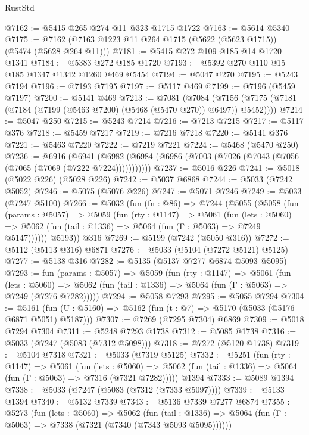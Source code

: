 \begin{lexlean}{RustStd}
\begin{coremodule}
@7162 := @5415 @265 @274 @11 @323 @1715 @1722
@7163 := @5614 @5340
@7175 := @7162 (@7163 @1223 @11 @264 @1715 (@5622 (@5623 @1715)) (@5474 (@5628 @264 @11)))
@7181 := @5415 @272 @109 @185 @14 @1720 @1341
@7184 := @5383 @272 @185 @1720
@7193 := @5392 @270 @110 @15 @185 @1347 @1342 @1260 @469 @5454
@7194 := @5047 @270
@7195 := @5243 @7194
@7196 := @7193 @7195
@7197 := @5117 @469
@7199 := @7196 (@5459 @7197)
@7200 := @5141 @469
@7213 := @7081
    (@7084 (@7156 (@7175 (@7181 (@7184 (@7199 (@5463 @7200) (@5468 (@5470 @270)) @6497)) @5452))))
@7214 := @5047 @250
@7215 := @5243 @7214
@7216 := @7213 @7215
@7217 := @5117 @376
@7218 := @5459 @7217
@7219 := @7216 @7218
@7220 := @5141 @376
@7221 := @5463 @7220
@7222 := @7219 @7221
@7224 := @5468 (@5470 @250)
@7236 := @6916
    (@6941 (@6982 (@6984 (@6986 (@7003 (@7026 (@7043 (@7056 (@7065 (@7069 (@7222 @7224)))))))))))
@7237 := @5016 @226
@7241 := @5018 (@5022 @226) (@5028 @226)
@7242 := @5037 @6868
@7244 := @5033 (@7242 @5052)
@7246 := @5075 (@5076 @226)
@7247 := @5071 @7246
@7249 := @5033 (@7247 @5100)
@7266 := @5032
    (fun (fn : @86) =>
    @7244
      (@5055
        (@5058
          (fun (params : @5057) =>
          @5059
            (fun (rty : @1147) =>
            @5061
              (fun (lets : @5060) =>
              @5062 (fun (tail : @1336) => @5064 (fun (Γ : @5063) => @7249 @5147))))))
        @5193))
    @316
@7269 := @5199 (@7242 (@5050 @316))
@7272 := @5112 (@5113 @316) @6871
@7276 := @5033 (@5104 (@7272 @5121) @5125)
@7277 := @5138 @316
@7282 := @5135 (@5137 @7277 @6874 @5093 @5095)
@7293 := fun (params : @5057) =>
  @5059
    (fun (rty : @1147) =>
    @5061
      (fun (lets : @5060) =>
      @5062 (fun (tail : @1336) => @5064 (fun (Γ : @5063) => @7249 (@7276 @7282)))))
@7294 := @5058 @7293
@7295 := @5055 @7294
@7304 := @5161 (fun (U : @5160) => @5162 (fun (t : @7) => @5170 (@5033 (@5176 @6871 @5051) @5187)))
@7307 := @7269 (@7295 @7304) @6869
@7309 := @5018 @7294 @7304
@7311 := @5248 @7293 @1738
@7312 := @5085 @1738
@7316 := @5033 (@7247 (@5083 (@7312 @5098)))
@7318 := @7272 (@5120 @1738)
@7319 := @5104 @7318
@7321 := @5033 (@7319 @5125)
@7332 := @5251
    (fun (rty : @1147) =>
    @5061
      (fun (lets : @5060) =>
      @5062 (fun (tail : @1336) => @5064 (fun (Γ : @5063) => @7316 (@7321 @7282)))))
    @1394
@7333 := @5089 @1394
@7338 := @5033 (@7247 (@5083 (@7312 (@7333 @5097))))
@7339 := @5133 @1394
@7340 := @5132 @7339
@7343 := @5136 @7339 @7277 @6874
@7355 := @5273
    (fun (lets : @5060) =>
    @5062
      (fun (tail : @1336) => @5064 (fun (Γ : @5063) => @7338 (@7321 (@7340 (@7343 @5093 @5095))))))

\end{coremodule}
\end{lexlean}

